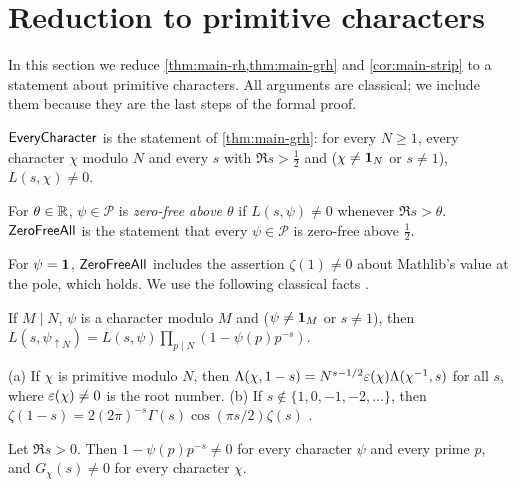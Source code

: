 \section{Reduction to primitive characters}\label{sec:reduction}

In this section we reduce \cref{thm:main-rh,thm:main-grh} and \cref{cor:main-strip} to a statement
about primitive characters. All arguments are classical; we include them because they are the last
steps of the formal proof.

\begin{definition}\label{def:everychar}
$\mathsf{EveryCharacter}$ is the statement of \cref{thm:main-grh}: for every $N\ge1$, every character
$\chi$ modulo $N$ and every $s$ with $\Re s>\frac12$ and ($\chi\neq\mathbf{1}_N$ or $s\neq1$),
$L(s,\chi)\neq0$. 
\end{definition}

\begin{definition}\label{def:zerofreeall}
For $\theta\in\mathbb{R}$, $\psi\in\mathcal P$ is \emph{zero-free above $\theta$} if $L(s,\psi)\ne0$ whenever
$\Re s>\theta$. $\mathsf{ZeroFreeAll}$ is the statement that every $\psi\in\mathcal P$ is zero-free
above $\frac12$. 
\end{definition}

For $\psi=\mathbf{1}$, $\mathsf{ZeroFreeAll}$ includes the assertion $\zeta(1)\neq0$ about Mathlib's value
at the pole, which holds. We use the following classical facts \cite[Ch.~5, 9]{Davenport2000}.

\begin{littheorem}\label{lit:reduction:level}
If $M\mid N$, $\psi$ is a character modulo $M$ and ($\psi\ne\mathbf{1}_M$ or $s\ne1$), then
$L(s,\psi_{\uparrow N})=L(s,\psi)\prod_{p\mid N}(1-\psi(p)p^{-s})$.
\end{littheorem}

\begin{littheorem}\label{lit:reduction:fe}
(a) If $\chi$ is primitive modulo $N$, then
$\Lambda(\chi,1-s)=N^{s-1/2}\varepsilon(\chi)\Lambda(\chi^{-1},s)$ for all $s$, where $\varepsilon(\chi)\ne0$ is the
root number. (b) If $s\notin\{1,0,-1,-2,\dots\}$, then
$\zeta(1-s)=2(2\pi)^{-s}\Gamma(s)\cos(\pi s/2)\zeta(s)$ \cite{Riemann1859}.
\end{littheorem}

\begin{lemma}\label{lem:reduction:factors}
Let $\Re s>0$. Then $1-\psi(p)p^{-s}\ne0$ for every character $\psi$ and every prime $p$, and
$G_\chi(s)\neq0$ for every character $\chi$.
\end{lemma}


